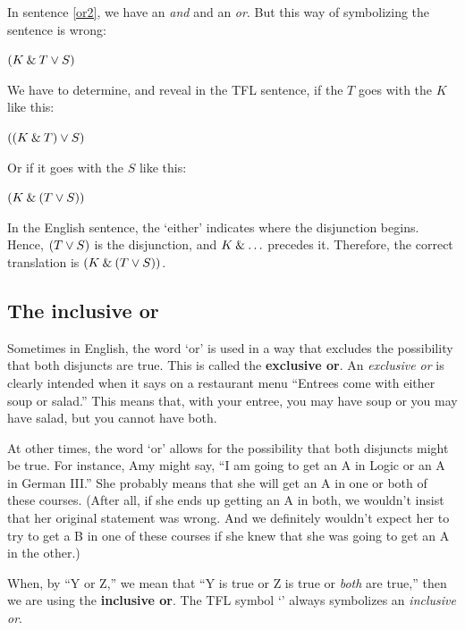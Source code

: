 In sentence \ref{or2}, we have an \textit{and} and an \textit{or}. But this way of symbolizing the sentence is wrong:
	\begin{earg}
		\item[] $(K \mathbin{\&} T \vee S)$ 
	\end{earg}
We have to determine, and reveal in the TFL sentence, if the $T$ goes with the $K$ like this:
	\begin{earg}
		\item[] $((K \mathbin{\&} T) \vee S)$ 
	\end{earg}
Or if it goes with the $S$ like this:
	\begin{earg}
		\item[] $(K \mathbin{\&} (T \vee S))$ 
	\end{earg}
In the English sentence, the `either' indicates where the disjunction begins. Hence, $(T \vee S)$ is the disjunction, and $K \mathbin{\&} \ldots$ precedes it. Therefore, the correct translation is 
$(K \mathbin{\&} (T \vee S))$.


\subsection{The inclusive or}\label{inclusive-or-1}

Sometimes in English, the word `or' is used in a way that excludes the possibility that both disjuncts are true. This is called the \textbf{exclusive or}.  An \emph{exclusive or} is clearly intended when it says on a restaurant menu ``Entrees come with either soup or salad.'' This means that, with your entree, you may have soup or you may have salad, but you cannot have both.

At other times, the word `or' allows for the possibility that both disjuncts might be true. For instance, Amy might say, ``I am going to get an A in Logic or an A in German III.'' She probably means that she will get an A in one or both of these courses. (After all, if she ends up getting an A in both, we wouldn't insist that her original statement was wrong. And we definitely wouldn't expect her to try to get a B in one of these courses if she knew that she was going to get an A in the other.)

When, by ``Y or Z,'' we mean that ``Y is true or Z is true or \textit{both} are true,'' then we are using the \textbf{inclusive or}. The TFL symbol `\eor' always symbolizes an \emph{inclusive or}.


